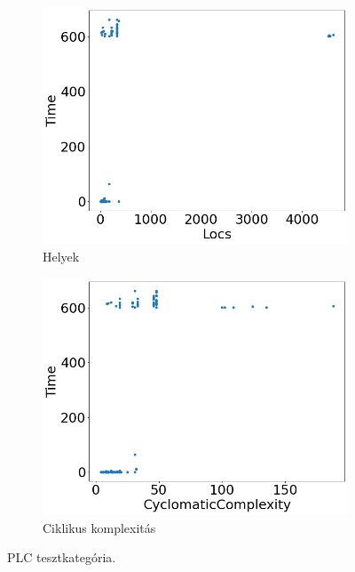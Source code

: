 \begin{figure}[ht]
\begin{subfigure}[b]{0.5\linewidth}
		\includegraphics[width=0.95\linewidth]{figures/plc/locs.png} 
		\caption{Helyek} 
	\end{subfigure}%
	\begin{subfigure}[b]{0.5\linewidth}
		\centering
		\includegraphics[width=0.95\linewidth]{figures/plc/cc.png}
		\caption{Ciklikus komplexitás}
	\end{subfigure}
	\caption{PLC tesztkategória.}
	\label{fig_plc}
\end{figure}

